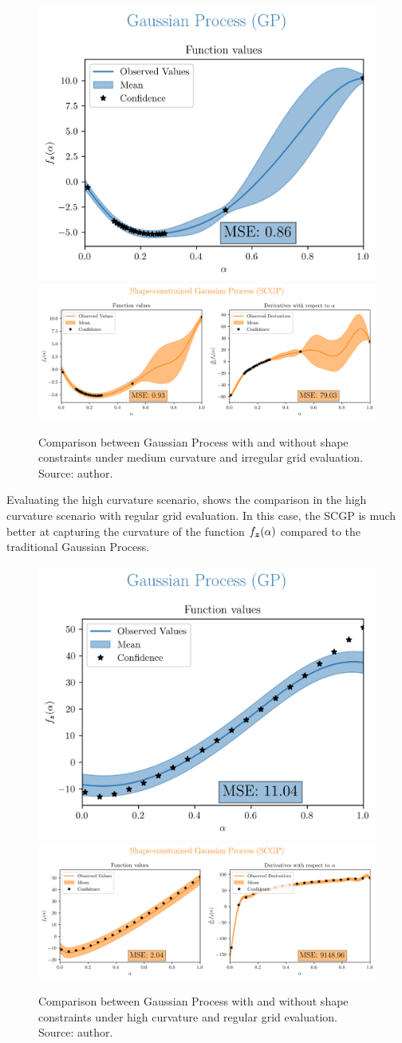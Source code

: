 \begin{figure}[H]
    \centering
    \includegraphics[width=.33\textwidth]{../experiments/adaptive_new_MC/GP_20_nobs.png}
    \includegraphics[width=.66\textwidth]{../experiments/adaptive_new_MC/SCGP_20_nobs.png}
    \caption{ {\small Comparison between Gaussian Process with and without shape constraints under medium curvature and irregular grid evaluation. Source: author.}}
    \label{fig:adaptiveMC}
\end{figure}

Evaluating the high curvature scenario,  shows the comparison in the high curvature scenario with regular grid evaluation. In this case, the SCGP is much better at capturing the curvature of the function \( f_{\boldsymbol{z}}(\alpha) \) compared to the traditional Gaussian Process.

\begin{figure}[H]
    \centering
    \includegraphics[width=.33\textwidth]{../experiments/uniform_new_HC/GP_20_nobs.png}
    \includegraphics[width=.66\textwidth]{../experiments/uniform_new_HC/SCGP_20_nobs.png}
    \caption{ {\small Comparison between Gaussian Process with and without shape constraints under high curvature and regular grid evaluation. Source: author.}}
    \label{fig:uniformHC}
\end{figure}


